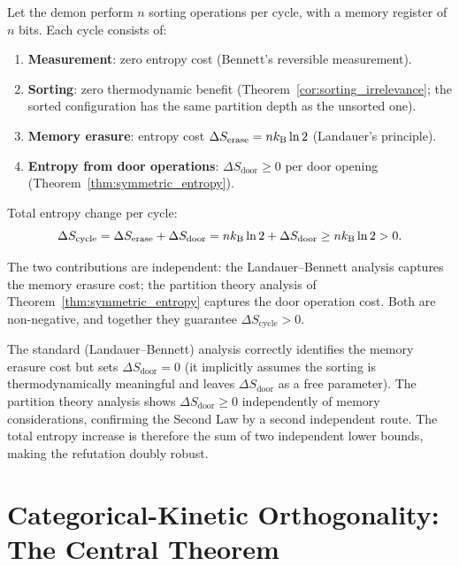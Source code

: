 Let the demon perform $n$ sorting operations per cycle, with a memory register
of $n$ bits. Each cycle consists of:

\begin{enumerate}[label=(\arabic*)]
  \item \textbf{Measurement}: zero entropy cost (Bennett's reversible measurement).
  \item \textbf{Sorting}: zero thermodynamic benefit (Theorem~\ref{cor:sorting_irrelevance};
        the sorted configuration has the same partition depth as the unsorted one).
  \item \textbf{Memory erasure}: entropy cost $\Delta S_{\mathrm{erase}} = n k_{\mathrm{B}} \ln 2$
        (Landauer's principle).
  \item \textbf{Entropy from door operations}: $\Delta S_{\mathrm{door}} \geq 0$
        per door opening (Theorem~\ref{thm:symmetric_entropy}).
\end{enumerate}

Total entropy change per cycle:
\begin{equation}
  \Delta S_{\mathrm{cycle}} = \Delta S_{\mathrm{erase}} + \Delta S_{\mathrm{door}}
  = n k_{\mathrm{B}} \ln 2 + \Delta S_{\mathrm{door}} \geq n k_{\mathrm{B}} \ln 2 > 0.
  \label{eq:total_entropy_cycle}
\end{equation}

The two contributions are independent: the Landauer--Bennett analysis captures
the memory erasure cost; the partition theory analysis of Theorem~\ref{thm:symmetric_entropy}
captures the door operation cost. Both are non-negative, and together they
guarantee $\Delta S_{\mathrm{cycle}} > 0$.

\begin{remark}
The standard (Landauer--Bennett) analysis correctly identifies the memory erasure
cost but sets $\Delta S_{\mathrm{door}} = 0$ (it implicitly assumes the sorting
is thermodynamically meaningful and leaves $\Delta S_{\mathrm{door}}$ as a free
parameter). The partition theory analysis shows $\Delta S_{\mathrm{door}} \geq 0$
independently of memory considerations, confirming the Second Law by a second
independent route. The total entropy increase is therefore the sum of two
independent lower bounds, making the refutation doubly robust.
\end{remark}

\section{Categorical-Kinetic Orthogonality: The Central Theorem}
\label{sec:cat_kin_orthogonality}

